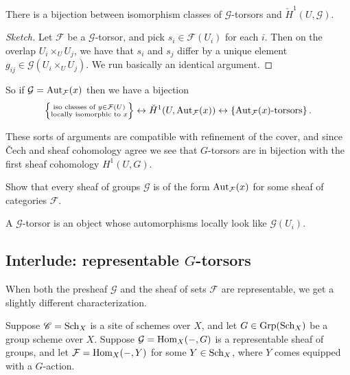 \documentclass[11pt,openany]{book}
\begin{document}
\begin{theorem} There is a bijection between isomorphism classes of $\mathcal{G}$-torsors and $\check{H}^1(U,\mathcal{G})$.
\end{theorem}
\begin{proof}[Sketch] Let $\mathcal{F}$ be a $\mathcal{G}$-torsor, and pick $s_i \in \mathcal{F}(U_i)$ for each $i$. Then on the overlap $U_i \times_U U_j$, we have that $s_i$ and $s_j$ differ by a unique element $g_{ij}\in \mathcal{G}(U_i \times_U U_j)$. We run basically an identical argument.
\end{proof}

So if $\mathcal{G} = \mathrm{Aut}_{\mathcal{F}}(x)$ then we have a bijection
\begin{align*}
    \left\{ \substack{\text{iso classes of }y\in \mathcal{F}(U) \\ \text{locally isomorphic to }x} \right\} \leftrightarrow \check{H}^1(U,\mathrm{Aut}_{\mathcal{F}}(x)) \leftrightarrow \left\{ \mathrm{Aut}_\mathcal{F}(x)\text{-torsors} \right\}.
\end{align*}

These sorts of arguments are compatible with refinement of the cover, and since \v{C}ech and sheaf cohomology agree we see that $G$-torsors are in bijection with the first sheaf cohomology $H^1(U,G)$.


%
\begin{exercise}\label{exer:every-sheaf-of-groups-is-aut} 
Show that every sheaf of groups $\mathcal{G}$ is of the form $\mathrm{Aut}_\mathcal{F}(x)$ for some sheaf of categories $\mathcal{F}$.
\end{exercise}

\begin{intuition} A $\mathcal{G}$-torsor is an object whose automorphisms locally look like $\mathcal{G}(U_i)$.
\end{intuition}

\subsection{Interlude: representable $G$-torsors}

When both the presheaf $\mathcal{G}$ and the sheaf of sets $\mathcal{F}$ are representable, we get a slightly different characterization. 

\begin{setup}\label{set:representable-torsor-and-group-scheme} Suppose $\mathscr{C} = \mathrm{Sch}_X$ is a site of schemes over $X$, and let $G \in \mathrm{Grp}(\mathrm{Sch}_X)$ be a group scheme over $X$. Suppose $\mathcal{G} = \mathrm{Hom}_X(-,G)$ is a representable sheaf of groups, and let $\mathcal{F} = \mathrm{Hom}_X(-,Y)$ for some $Y\in \mathrm{Sch}_X$, where $Y$ comes equipped with a $G$-action.
\end{setup}
\end{document}
